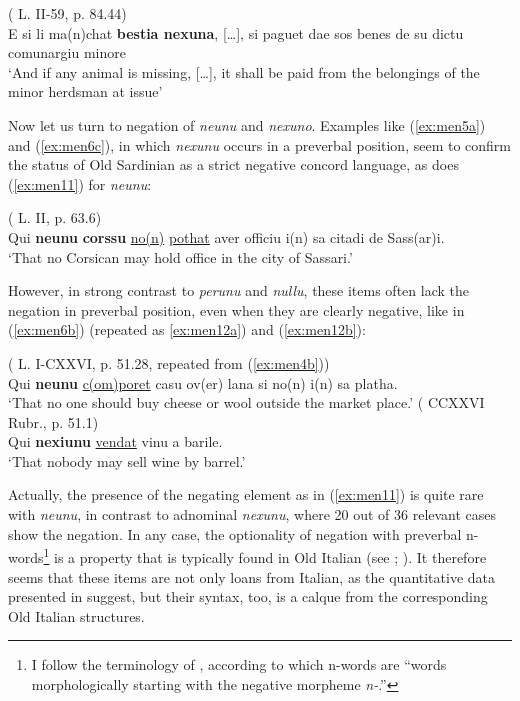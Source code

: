 \documentclass[output=paper,colorlinks,citecolor=brown]{langscibook}
\begin{document}
    \ex\label{ex:men10b}( L. II-59, p. 84.44)\\
     E si li ma(n)chat \textbf{bestia nexuna}, […], si paguet dae sos benes de su dictu comunargiu minore\\
    ‘And if any animal is missing, […], it shall be paid from the belongings of the minor herdsman at issue’
\z
\z

Now let us turn to negation of \textit{neunu} and \textit{nexuno}. Examples like (\ref{ex:men5a}) and (\ref{ex:men6c}), in which \textit{nexunu} occurs in a preverbal position, seem to confirm the status of Old Sardinian as a strict negative concord language, as does (\ref{ex:men11}) for \textit{neunu}: 

\ea\label{ex:men11}
( L. II, p. 63.6)\\
Qui \textbf{neunu} \textbf{corssu} \ul{no(n)} \ul{pothat} aver officiu i(n) sa citadi de Sass(ar)i.\\
‘That no Corsican may hold office in the city of Sassari.’
\z

However, in strong contrast to \textit{perunu} and \textit{nullu}, these items often lack the negation in preverbal position, even when they are clearly negative, like in (\ref{ex:men6b}) (repeated as \ref{ex:men12a}) and (\ref{ex:men12b}):

\ea\label{ex:men12}
    \ea\label{ex:men12a}( L. I-CXXVI, p. 51.28, repeated from (\ref{ex:men4b}))\\
    Qui \textbf{neunu} \ul{c(om)poret} casu ov(er) lana si no(n) i(n) sa platha.\\
    ‘That no one should buy cheese or wool outside the market place.’
    \ex\label{ex:men12b}( CCXXVI Rubr., p. 51.1)\\
     Qui \textbf{nexiunu} \ul{vendat} vinu a barile.\\
    ‘That nobody may sell wine by barrel.’
\z
\z

Actually, the presence of the negating element as in (\ref{ex:men11}) is quite rare with \textit{neunu}, in contrast to adnominal \textit{nexunu}, where 20 out of 36 relevant cases show the negation. In any case, the optionality of negation with preverbal n-words\footnote{I follow the terminology of \citet[1]{FrancoPoletto2016}, according to which n-words are “words morphologically starting with the negative morpheme \textit{n-}.”} is a property that is typically found in Old Italian (see \citealt{FrancoPoletto2016}; \cite{FrancoKellertMenschingPoletto2016}). It therefore seems that these items are not only loans from Italian, as the quantitative data presented in  suggest, but their syntax, too, is a calque from the corresponding Old Italian structures.
\end{document}
